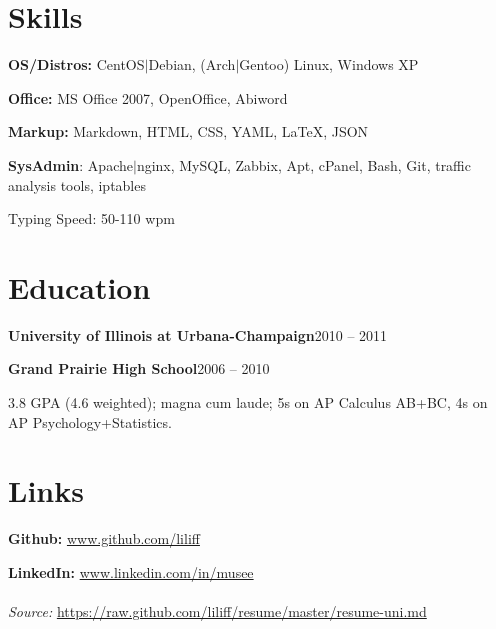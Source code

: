\documentclass{article}
\newenvironment{entity}[2]{%
    \textbf{#1}\hfill #2\par
}{
    \vspace{0.1em}%
    \par%
}
\begin{document}
\section{Skills}

\textbf{OS/Distros:} CentOS$|$Debian, (Arch$|$Gentoo) Linux, Windows XP\par
\textbf{Office:} MS Office 2007, OpenOffice, Abiword\par
\textbf{Markup:} Markdown, HTML, CSS, YAML, \LaTeX, JSON\par
\textbf{SysAdmin}: Apache$|$nginx, MySQL, Zabbix, Apt, cPanel, Bash, Git, traffic analysis tools, iptables\par
Typing Speed: 50-110 wpm
\section{Education}

    \begin{entity}{University of Illinois at Urbana-Champaign}{2010 -- 2011}


    \end{entity}
    \begin{entity}{Grand Prairie High School}{2006 -- 2010}
3.8 GPA (4.6 weighted); magna cum laude; 5s on AP Calculus AB+BC, 4s on AP Psychology+Statistics.

    \end{entity}
\section{Links}

\textbf{Github:} \url{www.github.com/liliff}\par
\textbf{LinkedIn:} \url{www.linkedin.com/in/musee}
\\
\\
\textsl{Source:} \url{https://raw.github.com/liliff/resume/master/resume-uni.md}
\end{document}
